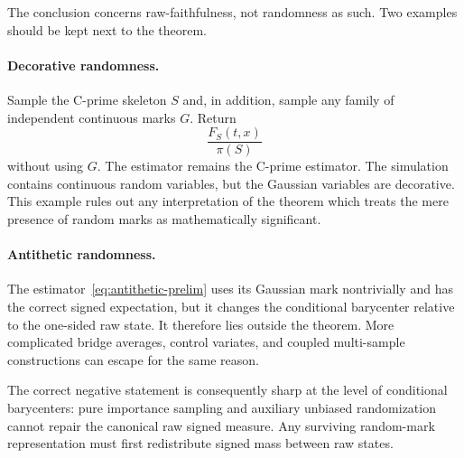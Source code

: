 The conclusion concerns raw-faithfulness, not randomness as such. Two examples should be kept next to the theorem.

\paragraph{Decorative randomness.}
Sample the C-prime skeleton $S$ and, in addition, sample any family of independent continuous marks $G$. Return
\begin{equation*}
  \frac{F_S(t,x)}{\pi(S)}
\end{equation*}
without using $G$. The estimator remains the C-prime estimator. The simulation contains continuous random variables, but the Gaussian variables are decorative. This example rules out any interpretation of the theorem which treats the mere presence of random marks as mathematically significant.

\paragraph{Antithetic randomness.}
The estimator~\eqref{eq:antithetic-prelim} uses its Gaussian mark nontrivially and has the correct signed expectation, but it changes the conditional barycenter relative to the one-sided raw state. It therefore lies outside the theorem. More complicated bridge averages, control variates, and coupled multi-sample constructions can escape for the same reason.

The correct negative statement is consequently sharp at the level of conditional barycenters: pure importance sampling and auxiliary unbiased randomization cannot repair the canonical raw signed measure. Any surviving random-mark representation must first redistribute signed mass between raw states.
